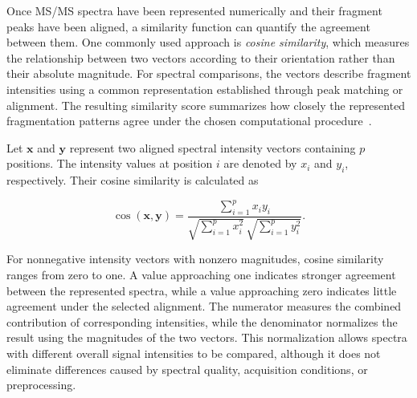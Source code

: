 
        Once MS/MS spectra have been represented numerically and their fragment peaks have been aligned, a similarity function can quantify the agreement between them. One commonly used approach is \emph{cosine similarity}, which measures the relationship between two vectors according to their orientation rather than their absolute magnitude. For spectral comparisons, the vectors describe fragment intensities using a common representation established through peak matching or alignment. The resulting similarity score summarizes how closely the represented fragmentation patterns agree under the chosen computational procedure~\cite{Wang2016,Bittremieux2022}.

        Let $\mathbf{x}$ and $\mathbf{y}$ represent two aligned spectral intensity vectors containing $p$ positions. The intensity values at position $i$ are denoted by $x_i$ and $y_i$, respectively. Their cosine similarity is calculated as

        \begin{equation}
            \operatorname{cos}(\mathbf{x},\mathbf{y})
            = \frac{\sum_{i=1}^{p} x_i y_i}
            {\sqrt{\sum_{i=1}^{p}x_i^2}\,
            \sqrt{\sum_{i=1}^{p}y_i^2}}.
            \label{eq:spectral-cosine}
        \end{equation}

        For nonnegative intensity vectors with nonzero magnitudes, cosine similarity ranges from zero to one. A value approaching one indicates stronger agreement between the represented spectra, while a value approaching zero indicates little agreement under the selected alignment. The numerator measures the combined contribution of corresponding intensities, while the denominator normalizes the result using the magnitudes of the two vectors. This normalization allows spectra with different overall signal intensities to be compared, although it does not eliminate differences caused by spectral quality, acquisition conditions, or preprocessing.


